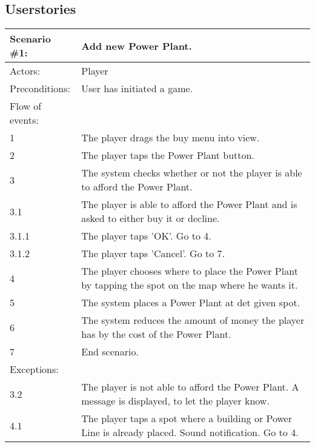 \subsection{Userstories}

\begin{tabular}{| l | p{10cm} |}
	\hline
	{\bf Scenario \#1:} & {\bf Add new Power Plant.} \\ \hline
	Actors: & Player \\ \hline
	Preconditions: & User has initiated a game. \\ \hline
	Flow of events: &  \\ \hline
	1 & The player drags the buy menu into view. \\ \hline
	2 & The player taps the Power Plant button. \\ \hline
	3 & The system checks whether or not the player is able to afford the Power Plant. \\ \hline
	3.1 & The player is able to afford the Power Plant and is asked to either buy it or decline. \\ \hline
	3.1.1 & The player taps 'OK'. Go to 4. \\ \hline
	3.1.2 & The player taps 'Cancel'. Go to 7. \\ \hline
	4 & The player chooses where to place the Power Plant by tapping the spot on the map where he wants it. \\ \hline
	5 & The system places a Power Plant at det given spot. \\ \hline
	6 & The system reduces the amount of money the player has by the cost of the Power Plant. \\ \hline
	7 & End scenario. \\ \hline
	Exceptions: & \\ \hline
	3.2 & The player is not able to afford the Power Plant. A message is displayed, to let the player know. \\ \hline
	4.1 & The player taps a spot where a building or Power Line is already placed. Sound notification. Go to 4. \\ \hline
\end{tabular}

